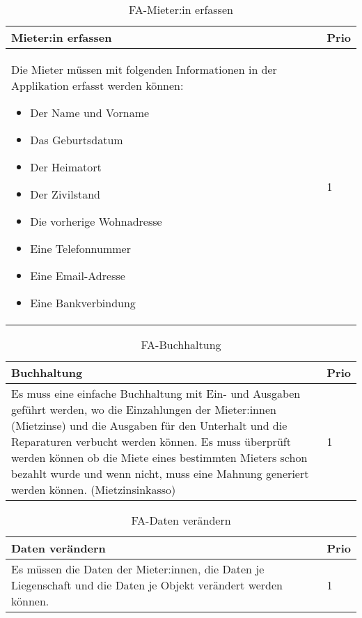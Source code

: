 \begin{table}[H]
  \centering
  \settowidth{}
  \setlength\extrarowheight{2pt}
  \begin{tabulary}{1.0\textwidth}{|m{16cm}|L|}
    \hline
    \textbf{Mieter:in erfassen}&\textbf{Prio}\\
    \hline
    Die Mieter müssen mit folgenden Informationen in der Applikation erfasst werden können:
    \begin{itemize}
      \item Der Name und Vorname
      \item Das Geburtsdatum
      \item Der Heimatort
      \item Der Zivilstand
      \item Die vorherige Wohnadresse
      \item Eine Telefonnummer
      \item Eine Email-Adresse
      \item Eine Bankverbindung
    \end{itemize} & 1\\
    \hline
  \end{tabulary}
  \caption{FA-Mieter:in erfassen}
  \label{faMieterinerfassen}
\end{table}

\begin{table}[H]
  \centering
  \settowidth{}
  \setlength\extrarowheight{2pt}
  \begin{tabulary}{1.0\textwidth}{|m{16cm}|L|}
    \hline
    \textbf{Buchhaltung}&\textbf{Prio}\\
    \hline
      Es muss eine einfache Buchhaltung mit Ein- und Ausgaben geführt werden, wo die Einzahlungen der Mieter:innen (Mietzinse) und die Ausgaben für den Unterhalt und die Reparaturen verbucht werden können. Es muss überprüft werden können ob die Miete eines bestimmten Mieters schon bezahlt wurde und wenn nicht, muss eine Mahnung generiert werden können. (Mietzinsinkasso)& 1\\
    \hline
  \end{tabulary}
  \caption{FA-Buchhaltung}
  \label{faBuchhaltung}
\end{table}

\begin{table}[H]
  \centering
  \settowidth{}
  \setlength\extrarowheight{2pt}
  \begin{tabulary}{1.0\textwidth}{|m{16cm}|L|}
    \hline
    \textbf{Daten verändern}&\textbf{Prio}\\
    \hline
    Es müssen die Daten der Mieter:innen, die Daten je Liegenschaft und die Daten je Objekt verändert werden können. & 1\\
    \hline
  \end{tabulary}
  \caption{FA-Daten verändern}
  \label{faDatenVeraendern}
\end{table}

